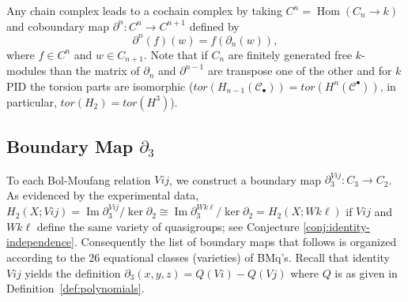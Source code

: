 \documentclass[11pt]{amsart}
\theoremstyle{definition}
\DeclareMathOperator{\Hom}{Hom}
\begin{document}
Any chain complex leads to a cochain complex by taking $C^n= \Hom(C_n\to k)$ and coboundary map 
$\partial^{n}: C^{n}\to C^{n+1} $ defined by $$\partial^{n}(f)(w)= f(\partial_n(w)),$$
where $f\in C^n$ and $w\in C_{n+1}$. Note that if $C_n$ are finitely generated free $k$-modules than the matrix of $\partial_n$ and $\partial^{n-1}$ are transpose one of the other and for $k$ PID the torsion parts are isomorphic ($tor(H_{n-1}(\mathcal C_\bullet))= tor(H^n(\mathcal C^{\bullet} ))$, in particular, $tor(H_{2})= tor(H^3)$).


\subsection{Boundary Map $\partial_3$}\label{S:boundarymaps}

To each Bol-Moufang relation $Vij$, we construct a boundary map $\partial^{Vij}_3:C_3 \to C_2$. As evidenced by the experimental data, $H_2(X;Vij) = \operatorname{Im}\partial_3^{Vij}/\ker \partial_2 \cong \operatorname{Im}\partial_3^{Wk\ell}/\ker \partial_2 = H_2(X;Wk\ell)$ if $Vij$ and $Wk\ell$ define the same variety of quasigroups; see Conjecture \ref{conj:identity-independence}. Consequently the list of boundary maps that follows is organized according to the 26 equational classes (varieties) of BMq's. Recall that identity $Vij$ yields the definition $\partial_3(x,y,z) = Q(Vi) - Q(Vj)$ where $Q$ is as given in Definition~\ref{def:polynomials}.
\end{document}
